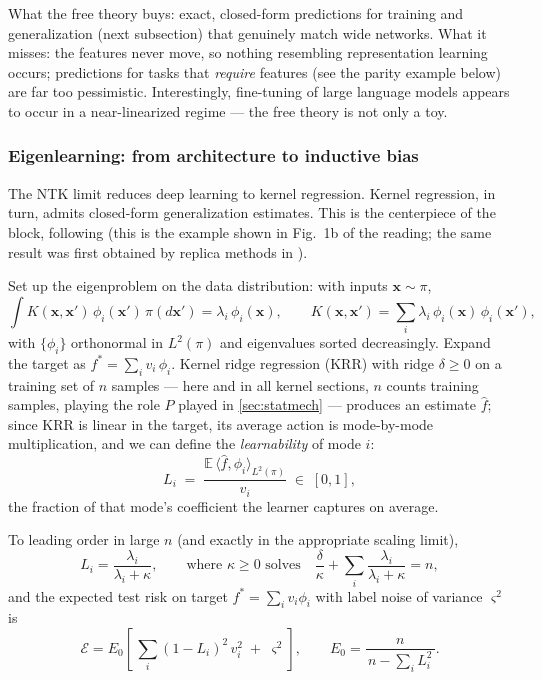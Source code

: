 \documentclass[11pt]{article}
\newcommand{\E}{\mathbb{E}}
\newcommand{\bv}[1]{\boldsymbol{#1}}
\begin{document}
What the free theory buys: exact, closed-form predictions for training and
generalization (next subsection) that genuinely match wide networks. What it
misses: the features never move, so nothing resembling representation
learning occurs; predictions for tasks that \emph{require} features (see the
parity example below) are far too pessimistic. Interestingly, fine-tuning of
large language models appears to occur in a near-linearized regime
\cite{malladi2023kernel} --- the free theory is not only a toy.

\subsubsection{Eigenlearning: from architecture to inductive bias}
\label{sec:eigenlearning}

The NTK limit reduces deep learning to kernel regression. Kernel regression,
in turn, admits closed-form generalization estimates. This is the
centerpiece of the block, following \cite{simon2023eigenlearning} (this is
the example shown in Fig.~1b of the reading; the same result was first
obtained by replica methods in \cite{bordelon2020spectrum,canatar2021spectral}).

Set up the eigenproblem on the data distribution: with inputs
$\bv{x} \sim \pi$,
\begin{equation}
  \int K(\bv{x},\bv{x}')\,\phi_i(\bv{x}')\,\pi(d\bv{x}')
  = \lambda_i\,\phi_i(\bv{x}),
  \qquad
  K(\bv{x},\bv{x}') = \sum_i \lambda_i\,\phi_i(\bv{x})\,\phi_i(\bv{x}'),
\end{equation}
with $\{\phi_i\}$ orthonormal in $L^2(\pi)$ and eigenvalues sorted
decreasingly. Expand the target as $f^{*} = \sum_i v_i\,\phi_i$. Kernel
ridge regression (KRR) with ridge $\delta \ge 0$ on a training set of $n$
samples --- here and in all kernel sections, $n$ counts training samples,
playing the role $P$ played in \cref{sec:statmech} --- produces an estimate
$\hat f$; since KRR is linear in the target, its average action is
mode-by-mode multiplication, and we can define the \emph{learnability} of
mode $i$:
\begin{equation}
  L_i \;=\; \frac{\E\,\langle \hat f, \phi_i\rangle_{L^2(\pi)}}{v_i}
  \;\in\; [0, 1],
\end{equation}
the fraction of that mode's coefficient the learner captures on average.

\begin{theorem}
\label{thm:eigenlearning}
To leading order in large $n$ (and exactly in the appropriate scaling
limit),
\begin{equation}
  L_i = \frac{\lambda_i}{\lambda_i + \kappa},
  \qquad
  \text{where } \kappa \ge 0 \text{ solves}\quad
  \frac{\delta}{\kappa} + \sum_i \frac{\lambda_i}{\lambda_i + \kappa} = n,
\end{equation}
and the expected test risk on target $f^* = \sum_i v_i \phi_i$ with label
noise of variance $\varsigma^2$ is
\begin{equation}
  \mathcal{E} = E_0 \left[\, \sum_i (1 - L_i)^2\, v_i^2
  \;+\; \varsigma^2 \right],
  \qquad
  E_0 = \frac{n}{\,n - \sum_i L_i^2\,}.
\end{equation}
\end{theorem}
\end{document}
